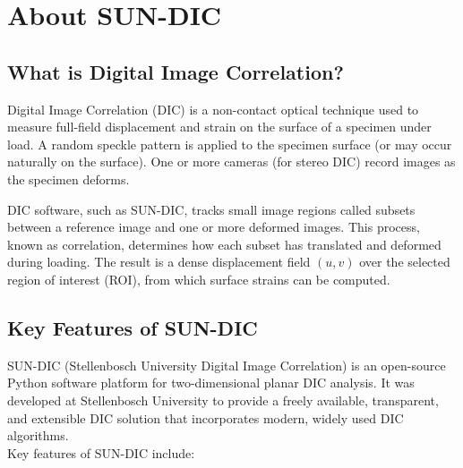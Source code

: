 \chapter{About SUN-DIC}
\label{sec:about}

\section{What is Digital Image Correlation?}

Digital Image Correlation (DIC) is a non-contact optical technique used to measure full-field displacement and strain on the surface of a specimen under load. A random speckle pattern is applied to the specimen surface (or may occur naturally on the surface). One or more cameras (for stereo DIC) record images as the specimen deforms.

DIC software, such as SUN-DIC, tracks small image regions called subsets between a reference image and one or more deformed images. This process, known as correlation, determines how each subset has translated and deformed during loading. The result is a dense displacement field $(u,v)$ over the selected region of interest (ROI), from which surface strains can be computed.

\section{Key Features of SUN-DIC}

SUN-DIC (Stellenbosch University Digital Image Correlation) is an open-source Python software platform for two-dimensional planar DIC analysis. It was developed at Stellenbosch University to provide a freely available, transparent, and extensible DIC solution that incorporates modern, widely used DIC algorithms.
~\\

\noindent
Key features of SUN-DIC include:

